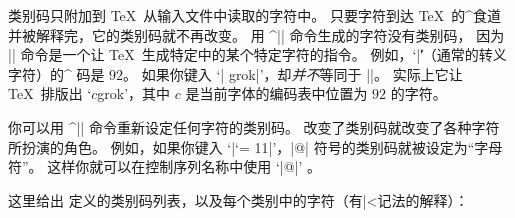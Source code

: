 类别码只附加到 \TeX\ 从输入文件中读取的字符中。
只要字符到达 \TeX\ 的^{食道}\seeconcept{\anatomy}并被解释完，它的类别码就不再改变。
用 ^|\char| 命令\ctsref{\char}生成的字符没有类别码，
因为 |\char| 命令是一个让 \TeX\ 生成特定中的某个特定字符的指令。
例如，`|\|'（通常的转义字符）的^{\ascii} 码是 $92$。
如果你键入 `| grok|'，却\emph{并不}等同于 |\grok|。
实际上它让 \TeX\ 排版出 `$c$grok'，其中 $c$ 是当前字体的编码表中位置为 $92$ 的字符。

你可以用 ^|\catcode| 命令\ctsref{\catcode}重新设定任何字符的类别码。
改变了类别码就改变了各种字符所扮演的角色。
例如，如果你键入 `|\catcode`\@ = 11|'，|@| 符号的类别码就被设定为“字母符”。
这样你就可以在控制序列名称中使用 `|@|' 。

这里给出 定义的类别码列表，以及每个类别中的字符（有|^^|记法的解释）：

